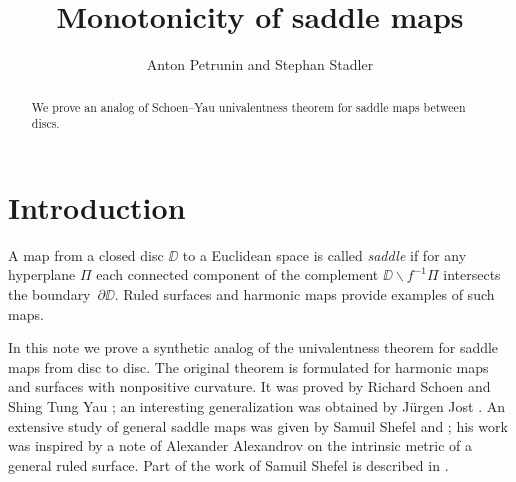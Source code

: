 \documentclass{article}
\begin{document}
\title{Monotonicity of saddle maps}
\author{Anton Petrunin and Stephan Stadler}


\newcommand{\Addresses}{{\bigskip\footnotesize
Anton Petrunin, \par\nopagebreak\textsc{Department of Mathematics, PSU, University Park, PA 16802, USA}
\par\nopagebreak
\textit{Email}: \texttt{petrunin@math.psu.edu}

\medskip
 
Stephan Stadler,
\par\nopagebreak\textsc{Mathematisches Institut der Universit\"at M\"unchen, Theresienstr. 39, D-80333 M\"unchen, Germany}
\par\nopagebreak
\textit{Email}: \texttt{stadler@math.lmu.de}
}}

\date{}

\maketitle

\begin{abstract}
We prove an analog of Schoen--Yau univalentness theorem for saddle maps between discs.
\end{abstract}

\section{Introduction}

A map from a closed disc $\DD$ to a Euclidean space is called \emph{saddle} if for any hyperplane $\Pi$ each connected component of the 
complement $\DD\backslash f^{-1}\Pi$ intersects the boundary~$\partial \DD$.
Ruled surfaces and harmonic maps provide examples of such maps.

In this note we prove a synthetic analog of the univalentness theorem for saddle maps from disc to disc.
The original theorem is formulated for harmonic maps and surfaces with nonpositive curvature.
It was proved by Richard Schoen and Shing Tung Yau \cite{schoen-yau};
an interesting generalization was obtained by J\"urgen Jost \cite{jost}.
An extensive study of general saddle maps was given by Samuil Shefel \cite{shefel-2D} and \cite{shefel-3D};
his work was inspired by a note of Alexander Alexandrov \cite{A} on the intrinsic metric of a general ruled surface.
Part of the work of Samuil Shefel is described in \cite{akp}.
\end{document}
